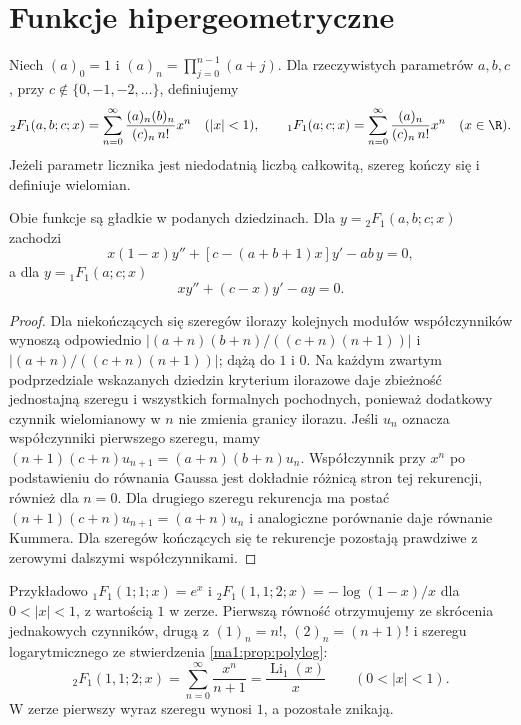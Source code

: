 \section{Funkcje hipergeometryczne}
\begin{definicja}
\label{ma1:def:hypergeometric-real}
Niech $(a)_0=1$ i $(a)_n=\prod_{j=0}^{n-1}(a+j)$.
Dla rzeczywistych parametrów $a,b,c$, przy
$c\notin\{0,-1,-2,\ldots\}$, definiujemy
\[
 {}_2F_1(a,b;c;x)=
 \sum_{n=0}^\infty\frac{(a)_n(b)_n}{(c)_n\,n!}x^n
 \quad (|x|<1),
 \qquad
 {}_1F_1(a;c;x)=
 \sum_{n=0}^\infty\frac{(a)_n}{(c)_n\,n!}x^n
 \quad (x\in\R).
\]
Jeżeli parametr licznika jest niedodatnią liczbą
całkowitą, szereg kończy się i definiuje wielomian.
\end{definicja}
\begin{stwierdzenie}
\label{ma1:prop:hypergeometric-real}
Obie funkcje są gładkie w podanych dziedzinach.
Dla $y={}_2F_1(a,b;c;x)$ zachodzi
\[
 x(1-x)y''+[c-(a+b+1)x]y'-ab\,y=0,
\]
a dla $y={}_1F_1(a;c;x)$
\[
 xy''+(c-x)y'-ay=0.
\]
\end{stwierdzenie}
\begin{proof}
Dla niekończących się szeregów ilorazy kolejnych
modułów współczynników wynoszą odpowiednio
$|(a+n)(b+n)/((c+n)(n+1))|$ i
$|(a+n)/((c+n)(n+1))|$; dążą do $1$ i $0$.
Na każdym zwartym podprzedziale wskazanych
dziedzin kryterium ilorazowe daje zbieżność
jednostajną szeregu i wszystkich formalnych
pochodnych, ponieważ dodatkowy czynnik
wielomianowy w $n$ nie zmienia granicy ilorazu.
Jeśli $u_n$ oznacza współczynniki pierwszego
szeregu, mamy
$(n+1)(c+n)u_{n+1}=(a+n)(b+n)u_n$.
Współczynnik przy $x^n$ po podstawieniu do
równania Gaussa jest dokładnie różnicą stron
tej rekurencji, również dla $n=0$.
Dla drugiego szeregu rekurencja ma postać
$(n+1)(c+n)u_{n+1}=(a+n)u_n$ i analogiczne
porównanie daje równanie Kummera.
Dla szeregów kończących się te rekurencje
pozostają prawdziwe z zerowymi dalszymi
współczynnikami.
\end{proof}
Przykładowo $ {}_1F_1(1;1;x)=e^x$ i
$ {}_2F_1(1,1;2;x)=-\log(1-x)/x$ dla $0<|x|<1$,
z wartością $1$ w zerze. Pierwszą równość
otrzymujemy ze skrócenia jednakowych czynników,
drugą z $(1)_n=n!$, $(2)_n=(n+1)!$ i szeregu
logarytmicznego ze stwierdzenia \ref{ma1:prop:polylog}:
\[
 {}_2F_1(1,1;2;x)=\sum_{n=0}^\infty\frac{x^n}{n+1}
 =\frac{\operatorname{Li}_1(x)}{x}
 \qquad(0<|x|<1).
\]
W zerze pierwszy wyraz szeregu wynosi $1$,
a pozostałe znikają.
